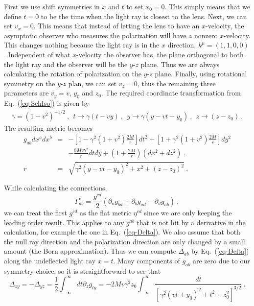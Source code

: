 \documentclass[aps,showpacs,onecolumn,floats,prd,superscriptaddress,nofootinbib]{revtex4}
\begin{document}
First we use shift symmetries in $x$ and $t$ to set $x_0=0$. This simply means that we define $t=0$ to be the time when the light ray is closest to the lens.
Next, we can set $v_x=0$. 
This means that instead of letting the lens to have an $x$-velocity, the asymptotic observer who measures the polarization will have a nonzero $x$-velocity. 
This changes nothing because the light ray is in the $x$ direction, $k^\mu = (1,1,0,0)$.
Independent of what $x$-velocity the observer has, the plane orthogonal to both the light ray and the observer will be the $y$-$z$ plane.
Thus we are always calculating the rotation of polarization on the $y$-$z$ plane.
Finally, using rotational symmetry on the $y$-$z$ plan, we can set $v_z=0$, thus the remaining three parameters are $v_y=v$, $y_0$ and $z_0$. The required coordinate transformation from Eq.~(\ref{eq-SchIso}) is given by
\begin{eqnarray}
\gamma = (1-v^2)^{-1/2}~, \ \ t \rightarrow \gamma(t-vy)~, \ \ y\rightarrow \gamma(y-vt-y_0)~, \ \
z\rightarrow (z-z_0)~.
\end{eqnarray}
The resulting metric becomes
\begin{eqnarray}
g_{ab}dx^adx^b &=& -\left[1-\gamma^2(1+v^2)\frac{2M}{r}\right]dt^2   
+ \left[1+\gamma^2(1+v^2)\frac{2M}{r}\right]dy^2 
\label{eq-metric}
\\ \nonumber
& & - \frac{8Mv\gamma^2}{r}dtdy + \left(1+\frac{2M}{r}\right)(dx^2+dz^2)~, \\
r &=& \sqrt{ \gamma^2(y-vt-y_0)^2 + x^2 + (z-z_0)^2 }~.
\end{eqnarray}

While calculating the connections,
\begin{equation}
\Gamma_{ab}^c = \frac{g^{cd}}{2}\left(\partial_a g_{bd} + \partial_b g_{ad} - \partial_d g_{ab} \right)~,
\end{equation}
we can treat the first $g^{cd}$ as the flat metric $\eta^{cd}$ since we are only keeping the leading order result. 
This applies to any $g^{ab}$ that is not hit by a derivative in the calculation, for example the one in Eq.~(\ref{eq-Delta}).
We also assume that both the null ray direction and the polarization direction are only changed by a small amount (the Born approximation). 
Thus we can compute $\Delta_{ab}$ by Eq.~(\ref{eq-Delta}) along the undeflected light ray $x=t$.
Many components of $g_{ab}$ are zero due to our symmetry choice, so it is straightforward to see that
\begin{equation}
\Delta_{zy} = -\Delta_{yz} = \frac{1}{2}\int_{-\infty}^{\infty} dt \partial_z g_{ty}
=-2Mv\gamma^2 z_0 \int_{-\infty}^{\infty}
\frac{dt}{\left[\gamma^2(vt+y_0)^2+t^2 + z_0^2\right]^{3/2}}~.
\end{equation}
\end{document}
